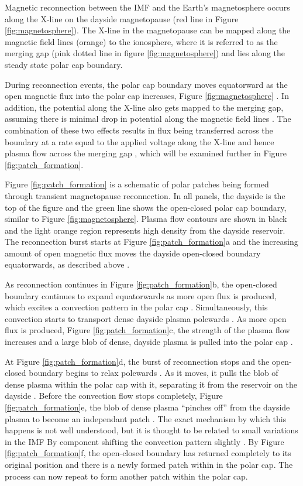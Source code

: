 Magnetic reconnection between the IMF and the Earth's magnetosphere occurs along the X-line on the dayside magnetopause (red line in Figure \ref{fig:magnetosphere}).  The X-line in the magnetopause can be mapped along the magnetic field lines (orange) to the ionosphere, where it is referred to as the merging gap (pink dotted line in figure \ref{fig:magnetosphere}) and lies along the steady state polar cap boundary.  

During reconnection events, the polar cap boundary moves equatorward as the open magnetic flux into the polar cap increases, Figure \ref{fig:magnetosphere} \citep{Cowley1991,Lockwood1992a}.  In addition, the potential along the X-line also gets mapped to the merging gap, assuming there is minimal drop in potential along the magnetic field lines \citep{Lockwood1992b}.  The combination of these two effects results in flux being transferred across the boundary at a rate equal to the applied voltage  along the X-line and hence plasma flow across the merging gap \citep{Lockwood1992b}, which will be examined further in Figure \ref{fig:patch_formation}.  

Figure \ref{fig:patch_formation} is a schematic of polar patches being formed through transient magnetopause reconnection.  In all panels, the dayside is the top of the figure and the green line shows the open-closed polar cap boundary, similar to Figure \ref{fig:magnetosphere}.  Plasma flow contours are shown in black and the light orange region represents high density from the dayside reservoir.  The reconnection burst starts at Figure \ref{fig:patch_formation}a and the increasing amount of open magnetic flux moves the dayside open-closed boundary equatorwards, as described above \citep{Cowley1991}.

As reconnection continues in Figure \ref{fig:patch_formation}b, the open-closed boundary continues to expand equatorwards as more open flux is produced, which excites a convection pattern in the polar cap \citep{Cowley1991}.  Simultaneously, this convection starts to transport dense dayside plasma polewards \citep{Lockwood1992b}.  As more open flux is produced, Figure \ref{fig:patch_formation}c, the strength of the plasma flow increases and a large blob of dense, dayside plasma is pulled into the polar cap \citep{Lockwood1992b}.

At Figure \ref{fig:patch_formation}d, the burst of reconnection stops and the open-closed boundary begins to relax polewards \citep{Cowley1991}.  As it moves, it pulls the blob of dense plasma within the polar cap with it, separating it from the reservoir on the dayside \citep{Lockwood1992b}.  Before the convection flow stops completely, Figure \ref{fig:patch_formation}e, the blob of dense plasma ``pinches off'' from the dayside plasma to become an independant patch \citep{Lockwood1992b}.  The exact mechanism by which this happens is not well understood, but it is thought to be related to small variations in the IMF By component shifting the convection pattern slightly \citep{Cowley1980,Lockwood1992b}.  By Figure \ref{fig:patch_formation}f, the open-closed boundary has returned completely to its original position and there is a newly formed patch within in the polar cap.  The process can now repeat to form another patch within the polar cap.

